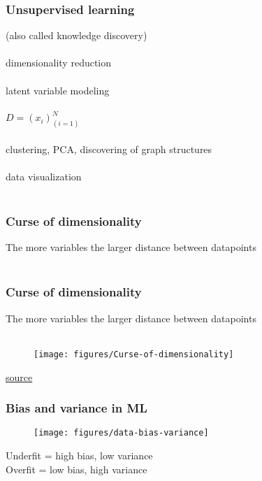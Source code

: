 \documentclass{beamer}
\begin{document}
\begin{frame}
	\frametitle{Unsupervised learning}
	\begin{center}
		(also called knowledge discovery)\\~\\
		dimensionality reduction\\~\\
		latent variable modeling\\~\\
		$D = (x_i)_{(i=1)}^N$ \\~\\
		clustering, PCA, discovering of graph structures\\~\\
		data visualization\\~\\
	\end{center}
\end{frame}

\begin{frame}
	\frametitle{Curse of dimensionality}
	\begin{center}
		The more variables the larger distance between datapoints\\~\\
	\end{center}
\end{frame}

\begin{frame}
	\frametitle{Curse of dimensionality}
	\begin{center}
		The more variables the larger distance between datapoints\\~\\
		\begin{figure}
			\texttt{[image: figures/Curse-of-dimensionality]}
			\label{fig:dim-curse}
		\end{figure}
		\href{http://www.newsnshit.com/curse-of-dimensionality-interactive-demo/}
		{source}
	\end{center}
\end{frame}

\begin{frame}
	\frametitle{Bias and variance in ML}
	\begin{center}
		\begin{figure}
			\texttt{[image: figures/data-bias-variance]}
			\label{fig:bias-var}
		\end{figure}
		\medskip
		Underfit = high bias, low variance\\
		Overfit = low bias, high variance
	\end{center}
\end{frame}
\end{document}
